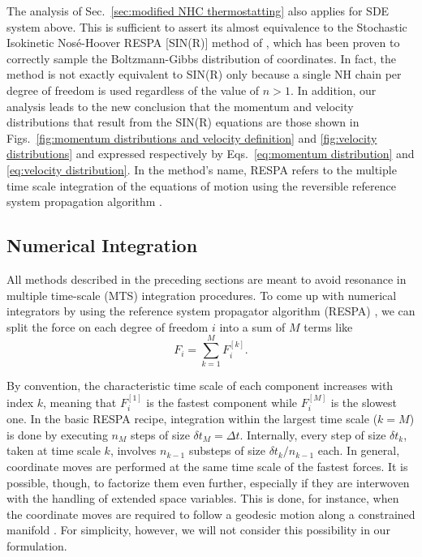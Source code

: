 \documentclass[
aip,
jcp,
reprint,
]{revtex4-1}
\newcommand{\nn}{n}
\begin{document}
The analysis of Sec.~\ref{sec:modified NHC thermostatting} also applies for SDE system above.
This is sufficient to assert its almost equivalence to the Stochastic Isokinetic Nos\'{e}-Hoover RESPA [SIN(R)] method of \citeauthor{Leimkuhler_2013} \cite{Leimkuhler_2013}, which has been proven to correctly sample the Boltzmann-Gibbs distribution of coordinates.
In fact, the method is not exactly equivalent to SIN(R) only because a single NH chain per degree of freedom is used regardless of the value of $\nn > 1$.
In addition, our analysis leads to the new conclusion that the momentum and velocity distributions that result from the SIN(R) equations are those shown in Figs.~\ref{fig:momentum distributions and velocity definition} and \ref{fig:velocity distributions} and expressed respectively by Eqs.~\eqref{eq:momentum distribution} and \eqref{eq:velocity distribution}.
In the method's name, RESPA refers to the multiple time scale integration of the equations of motion using the reversible reference system propagation algorithm \cite{Tuckerman_1992}.

\subsection{Numerical Integration}
\label{sec: numerical integration}

All methods described in the preceding sections are meant to avoid resonance in multiple time-scale (MTS) integration procedures.
To come up with numerical integrators by using the reference system propagator algorithm (RESPA) \cite{Tuckerman_1992}, we can split the force on each degree of freedom $i$ into a sum of $M$ terms like
\begin{equation*}
F_i = \sum_{k=1}^M F_i^{[k]}.
\end{equation*}

By convention, the characteristic time scale of each component increases with index $k$, meaning that $F_i^{[1]}$ is the fastest component while $F_i^{[M]}$ is the slowest one.
In the basic RESPA recipe, integration within the largest time scale ($k=M$) is done by executing $n_M$ steps of size $\delta t_M = \Delta t$.
Internally, every step of size $\delta t_k$, taken at time scale $k$, involves $n_{k-1}$ substeps of size $\delta t_k/n_{k-1}$ each.
In general, coordinate moves are performed at the same time scale of the fastest forces.
It is possible, though, to factorize them even further, especially if they are interwoven with the handling of extended space variables.
This is done, for instance, when the coordinate moves are required to follow a geodesic motion along a constrained manifold \cite{Leimkuhler_2016}.
For simplicity, however, we will not consider this possibility in our formulation.
\end{document}
